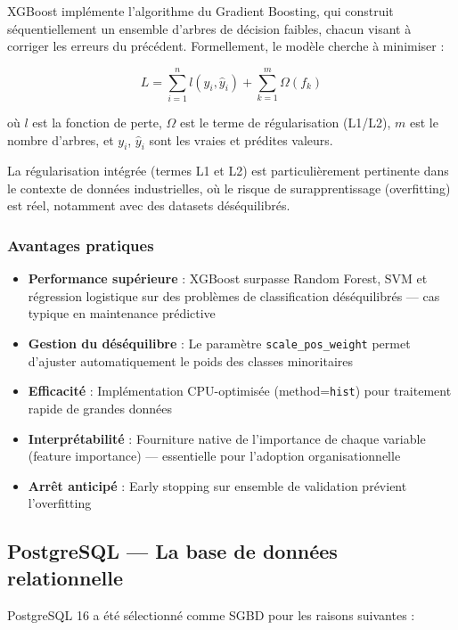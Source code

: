 \documentclass[a4paper,12pt]{report}
\begin{document}
XGBoost implémente l'algorithme du Gradient Boosting, qui construit séquentiellement un ensemble d'arbres de décision faibles, chacun visant à corriger les erreurs du précédent. Formellement, le modèle cherche à minimiser :

$$L = \sum_{i=1}^{n} l(y_i, \hat{y}_i) + \sum_{k=1}^{m} \Omega(f_k)$$

où $l$ est la fonction de perte, $\Omega$ est le terme de régularisation (L1/L2), $m$ est le nombre d'arbres, et $y_i$, $\hat{y}_i$ sont les vraies et prédites valeurs.

La régularisation intégrée (termes L1 et L2) est particulièrement pertinente dans le contexte de données industrielles, où le risque de surapprentissage (overfitting) est réel, notamment avec des datasets déséquilibrés.

\subsubsection{Avantages pratiques}

\begin{itemize}
    \item \textbf{Performance supérieure} : XGBoost surpasse Random Forest, SVM et régression logistique sur des problèmes de classification déséquilibrés — cas typique en maintenance prédictive
    \item \textbf{Gestion du déséquilibre} : Le paramètre \texttt{scale\_pos\_weight} permet d'ajuster automatiquement le poids des classes minoritaires
    \item \textbf{Efficacité} : Implémentation CPU-optimisée (method=\texttt{hist}) pour traitement rapide de grandes données
    \item \textbf{Interprétabilité} : Fourniture native de l'importance de chaque variable (feature importance) — essentielle pour l'adoption organisationnelle
    \item \textbf{Arrêt anticipé} : Early stopping sur ensemble de validation prévient l'overfitting
\end{itemize}

\subsection{PostgreSQL — La base de données relationnelle}

PostgreSQL 16 a été sélectionné comme SGBD pour les raisons suivantes :
\end{document}
